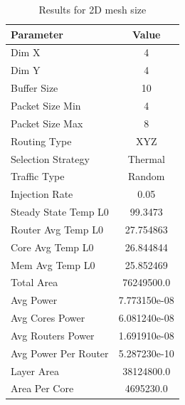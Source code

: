 \documentclass[conference]{IEEEtran}
\begin{document}
	\begin{table}[t]
		\centering		
		\begin{tabular}{|l|c|}
			\hline
			\textbf{Parameter} & \textbf{Value} \\ \hline
			Dim X & 4 \\ \hline
			Dim Y & 4 \\ \hline
			Buffer Size & 10 \\ \hline
			Packet Size Min & 4 \\ \hline
			Packet Size Max & 8 \\ \hline
			Routing Type & XYZ \\ \hline
			Selection Strategy & Thermal \\ \hline
			Traffic Type & Random \\ \hline
			Injection Rate & 0.05 \\ \hline
			Steady State Temp L0 & 99.3473 \\ \hline
			Router Avg Temp L0 & 27.754863 \\ \hline
			Core Avg Temp L0 & 26.844844 \\ \hline
			Mem Avg Temp L0 & 25.852469 \\ \hline
			Total Area & 76249500.0 \\ \hline
			Avg Power & 7.773150e-08 \\ \hline
			Avg Cores Power & 6.081240e-08 \\ \hline
			Avg Routers Power & 1.691910e-08 \\ \hline
			Avg Power Per Router & 5.287230e-10 \\ \hline
			Layer Area & 38124800.0 \\ \hline
			Area Per Core & 4695230.0 \\ \hline
		\end{tabular}
		\caption{Results for 2D mesh size}
		\label{tab:2d_results}
	\end{table}
\end{document}
